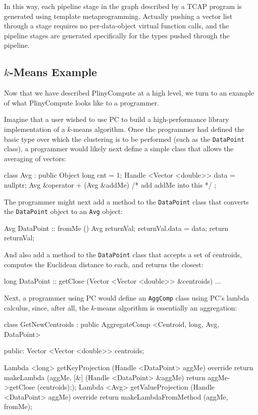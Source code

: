 In this way, each pipeline stage in the graph described by a TCAP program is generated using template metaprogramming.
Actually pushing a vector list through a stage requires no per-data-object virtual function calls, and the pipeline stages
are generated specifically for the types pushed through the pipeline.

\subsection{$k$-Means Example}

Now that we have described PlinyCompute at a high level, we turn to an example of what PlinyCompute looks like to a programmer.

Imagine that a user wished to use PC to build a high-performance library implementation of a $k$-means algorithm.
Once the programmer had defined the basic type over which the clustering is to be performed (such as the
\texttt{DataPoint} class), 
a programmer would likely next define a simple class that allows the averaging of vectors:

\begin{code}
class Avg : public Object {
	long cnt = 1;
	Handle <Vector <double>> data = nullptr;
	Avg &operator + (Avg &addMe) {/* add addMe into this */}
};
\end{code}

\noindent
The programmer might next add a method to the \texttt{DataPoint} class that converts the \texttt{DataPoint} object to an \texttt{Avg} object:

\begin{code}
Avg DataPoint :: fromMe () {
	Avg returnVal;
	returnVal.data = data;
	return returnVal;
}
\end{code}

\noindent
And also add a method to the \texttt{DataPoint} class that accepts a set of centroids, computes the Euclidean distance to
each, and returns the closest:

\begin{code}
long DataPoint :: getClose (Vector <Vector <double>> &centroids) {...}
\end{code}

\noindent
Next, a programmer using PC would define an \texttt{AggComp} class using PC's lambda calculus, since, after all, the $k$-means algorithm is essentially 
an aggregation:

\begin{code}
class GetNewCentroids : public AggregateComp <Centroid, long, Avg, DataPoint> {

public:
   Vector <Vector <double>> centroids;

   Lambda <long> getKeyProjection (Handle <DataPoint> aggMe) override {
      return makeLambda (aggMe, [&] (Handle <DataPoint> &aggMe) 
         {return aggMe->getClose (centroids);});
   }
   Lambda <Avg> getValueProjection (Handle <DataPoint> aggMe) override {
      return makeLambdaFromMethod (aggMe, fromMe);
   }
}
\end{code}

